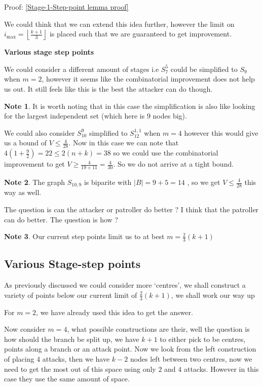 \documentclass[a4paper,10pt]{article}
\newcommand{\floor}[1]{\left \lfloor #1 \right \rfloor}
\theoremstyle{definition}
\theoremstyle{definition}
\theoremstyle{remark}
\theoremstyle{definition}
\newtheorem*{note}{Note}
\begin{document}
Proof: \ref{Stage-1-Step-point lemma proof}

We could think that we can extend this idea further, however the limit on $i_{\max}=\floor{\frac{k+1}{3}}$ is placed such that we are guaranteed to get improvement.

\textbf{Various stage step points}

We could consider a different amount of stages i.e $S_{7}^{5}$ could be simplified to $S_{9}$ when $m=2$, however it seems like the combinatorial improvement does not help us out. It still feels like this is the best the attacker can do though.

\begin{note}
It is worth noting that in this case the simplification is also like looking for the largest independent set (which here is $9$ nodes big).
\end{note}

We could also consider $S_{10}^{9}$ simplified to $S_{12}^{1,1}$ when $m=4$ however this would give us a bound of $V \leq \frac{4}{28}$. Now in this case we can note that $4(1+\frac{9}{2})=22 \leq 2(n+k)=38$ so we could use the combinatorial improvement to get $V \geq \frac{4}{19+11}=\frac{4}{30}$. So we do not arrive at a tight bound.  

\begin{note}
The graph $S_{10,9}$ is biparite with $|B|=9+5=14$ , so we get $V \leq \frac{4}{28}$ this way as well.
\end{note}

The question is can the attacker or patroller do better ?
I think that the patroller can do better. The question is how ?

\begin{note}
Our current step points limit us to at best $m=\frac{2}{3}(k+1)$
\end{note}

\subsection{Various Stage-step points}
As previously discussed we could consider more `centres', we shall construct a variety of points below our current limit of $\frac{2}{3}(k+1)$, we shall work our way up

For $m=2$, we have already used this idea to get the answer.

Now consider $m=4$, what possible constructions are their, well the question is how should the branch be split up, we have $k+1$ to either pick to be centres, points along a branch or an attack point. Now we look from the left construction of placing $4$ attacks, then we have $k-2$ nodes left between two centres, now we need to get the most out of this space using only $2$ and $4$ attacks. However in this case they use the same amount of space.
\end{document}
